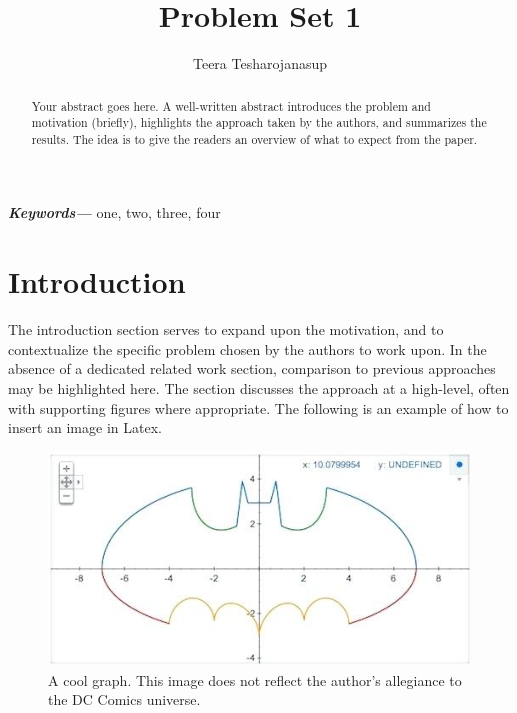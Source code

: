 \documentclass[a4paper]{article}
\providecommand{\keywords}[1]
{
  \small	
  \textbf{\; \textit{Keywords---}} #1
}
\begin{document}
\title{\textbf{\huge{Problem Set 1}}}

\author{\textbf\large{Teera Tesharojanasup}}



\date{}

\maketitle
\begin{abstract}
Your abstract goes here. A well-written abstract introduces the problem and motivation (briefly), highlights the approach taken by the authors, and summarizes the results. The idea is to give the readers an overview of what to expect from the paper.
\end{abstract}\maketitle

\keywords{one, two, three, four}

\section*{Introduction}

The introduction section serves to expand upon the motivation, and to contextualize the specific problem chosen by the authors to work upon. In the absence of a dedicated related work section, comparison to previous approaches may be highlighted here. The section discusses the approach at a high-level, often with supporting figures where appropriate. The following is an example of how to insert an image in Latex.

\begin{figure}[h]
    \centering
    \includegraphics[width=0.8\linewidth]{batman.jpg}
    \caption{A cool graph. This image does not reflect the author's allegiance to the DC Comics universe.}
    \label{fig:1}
\end{figure}
\end{document}
